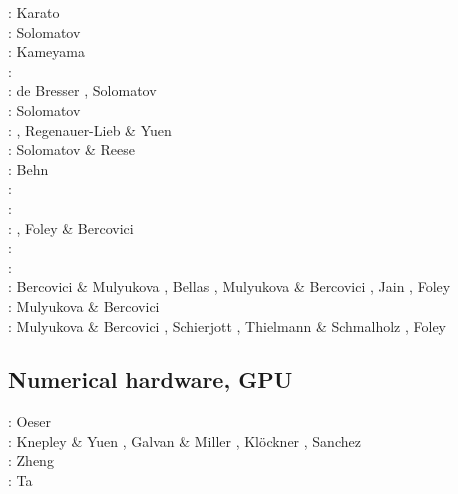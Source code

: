 \begin{scriptsize}
\nineteeneightyfour: Karato \cite{kara84}\\
\nineteenninetysix: Solomatov \cite{solo96}\\
\nineteenninetyseven: Kameyama \etal \cite{kayf97}\\
\nineteeneightynine: \cite{brcp99}\\
\twothousandone: de Bresser \etal \cite{dets01}, Solomatov \cite{solo01}\\
\twothousandtwo: Solomatov \etal \cite{soet02}\\
\twothousandthree: \cite{hapa03}, Regenauer-Lieb \& Yuen \cite{reyu03}\\
\twothousandeight: Solomatov \& Reese \cite{sore08}\\
\twothousandnine: Behn \etal \cite{behe09}\\
\twothousandeleven: \cite{rorb11}\\
\twothousandthirteen: \cite{beri13}\\
\twothousandfourteen: \cite{besr14}, Foley \& Bercovici \cite{fobe14} \\
\twothousandfifteen: \cite{thrk15}\cite{tukb15}\cite{pevp15}\cite{glfa15}\\
\twothousandseventeen: \cite{ceww17}\cite{daef17}\cite{mube17}\cite{scdu17}\\
\twothousandeighteen: Bercovici \& Mulyukova \cite{bemu18}, Bellas \etal \cite{bezb18},
                      Mulyukova \& Bercovici \cite{mube18}, Jain \etal \cite{jakk18},
                      Foley \cite{fole18} \\
\twothousandnineteen: Mulyukova \& Bercovici \cite{mube19}\\
\twothousandtwenty: Mulyukova \& Bercovici \cite{mube20}, Schierjott \etal \cite{scrt20,sctr20},
                    Thielmann \& Schmalholz \cite{thsc20}, Foley \cite{fole20}
\end{scriptsize}

\subsection{Numerical hardware, GPU}
\label{sec:topics:hardware}

\begin{scriptsize}
\twothousandsix: Oeser \etal \cite{oebm06}\\
\twothousandthirteen: Knepley \& Yuen \cite{knyu13}, Galvan \& Miller \cite{gami13}, 
                      Kl\"ockner \etal \cite{klwh13}, Sanchez \etal \cite{sagy13}\\
\twothousandfourteen: Zheng \etal{} \cite{zhzg14}\\
\twothousandfifteen: Ta \etal \cite{tact15}\\
\end{scriptsize}

